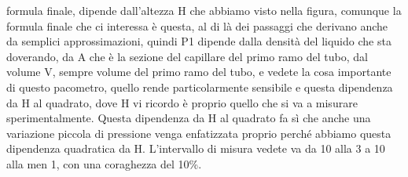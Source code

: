 formula finale, dipende dall'altezza H che abbiamo visto nella figura, comunque la formula finale che ci interessa è questa, al di là dei passaggi che derivano anche da semplici approssimazioni, quindi P1 dipende dalla densità del liquido che sta doverando, da A che è la sezione del capillare del primo ramo del tubo, dal volume V, sempre volume del primo ramo del tubo, e vedete la cosa importante di questo pacometro, quello rende particolarmente sensibile e questa dipendenza da H al quadrato, dove H vi ricordo è proprio quello che si va a misurare sperimentalmente. Questa dipendenza da H al quadrato fa sì che anche una variazione piccola di pressione venga enfatizzata proprio perché abbiamo questa dipendenza quadratica da H. L'intervallo di misura vedete va da 10 alla 3 a 10 alla men 1, con una coraghezza del 10\%.

